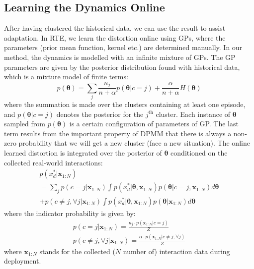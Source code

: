 \documentclass[journal]{IEEEtran}
\begin{document}
\subsection{Learning the Dynamics Online}
After having clustered the historical data, we can use the result to assist adaptation.
In RTE, we learn the distortion online using GPs, where the parameters (prior mean function, kernel etc.) are determined manually.
In our method, the dynamics is modelled with an infinite mixture of GPs. 
The GP parameters are given by the posterior distribution found with historical data, which is a mixture model of finite terms:
\begin{equation}
p(\bm{\theta}) = \sum_j \frac{n_j}{n + \alpha} p(\bm{\theta}|c=j) 
+ \frac{\alpha}{n + \alpha} H(\bm{\theta})
\label{trained_mixture_model}
\end{equation}
where the summation is made over the clusters containing at least one episode, and $p(\bm{\theta}|c=j)$ denotes the posterior for the $j^{\text{th}}$ cluster.
Each instance of $\bm{\theta}$ sampled from $p(\bm{\theta})$ is a certain configuration of parameters of GP.
The last term results from the important property of DPMM that there is always a non-zero probability that we will get a new cluster (face a new situation).
The online learned distortion is integrated over the posterior of $\bm{\theta}$ conditioned on the collected real-world interactions:
\begin{equation}
\begin{gathered}
p(x^*_d|\bm{x}_{1:N}) 
\\
= \sum_j p(c=j| \bm{x}_{1:N}) \int p(x^*_d|\bm{\theta}, \bm{x}_{1:N})p(\bm{\theta}|c=j, \bm{x}_{1:N}) d\bm{\theta} 
\\
+ p(c \neq j, \forall j|\bm{x}_{1:N}) \int p(x^*_d|\bm{\theta}, \bm{x}_{1:N}) p(\bm{\theta} | \bm{x}_{1:N}) d\bm{\theta}
\end{gathered}
\label{MGP_posterior}
\end{equation}
where the indicator probability is given by:
\begin{equation}
\begin{gathered}
p(c=j| \bm{x}_{1:N}) 
= \frac{n_j \cdot p(\bm{x}_{1:N}|c=j)
}{Z}
\\ 
p(c \neq j, \forall j| \bm{x}_{1:N})
= \frac{\alpha \cdot p(\bm{x}_{1:N}|c \neq j, \forall j)
}{Z}
\end{gathered}
\label{MGP_indicator}
\end{equation}
where $\bm{x}_{1:N}$ stands for the collected ($N$ number of) interaction data during deployment.
\end{document}
